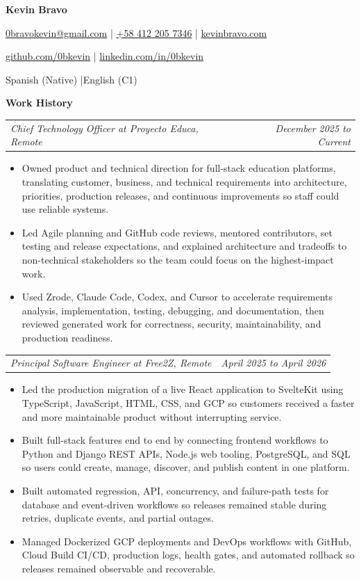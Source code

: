 \documentclass[10pt,letterpaper]{article}
\makeatletter
\newcommand{\bodyfont}{\fontsize{10.5}{15.75}\selectfont}
\newcommand{\contactfont}{\fontsize{12}{15}\selectfont}
\newcommand{\sectiontitle}[1]{%
  \vspace{4pt}
  {\bodyfont\textbf{#1}}\par
  \nopagebreak[4]
  \vspace{2pt}
}
\newcommand{\roleline}[2]{%
  \begin{tabularx}{\textwidth}{@{}Xr@{}}
    \bodyfont\textit{#1} & \bodyfont\textit{#2}
  \end{tabularx}
  \nopagebreak[4]
  \vspace{1pt}
}
\makeatother
\begin{document}
\bodyfont
\raggedright

\begin{center}
  {\fontsize{14}{17}\selectfont\textbf{Kevin Bravo}}\par
  \vspace{3pt}
  {\contactfont
    \href{mailto:0bravokevin@gmail.com}{0bravokevin@gmail.com}
    \enspace|\enspace
    \href{tel:+584122057346}{+58 412 205 7346}
    \enspace|\enspace
    \href{https://kevinbravo.com}{kevinbravo.com}
  }\par
  {\contactfont
    \href{https://github.com/0bkevin}{github.com/0bkevin}
    \enspace|\enspace
    \href{https://www.linkedin.com/in/0bkevin/}{linkedin.com/in/0bkevin}
  }\par
  {\contactfont Spanish (Native) \enspace|\enspace English (C1)}
\end{center}

\sectiontitle{Work History}

\roleline{Chief Technology Officer at Proyecto Educa, Remote}{December 2025 to Current}
\begin{itemize}
  \item Owned product and technical direction for full-stack education platforms, translating customer, business, and technical requirements into architecture, priorities, production releases, and continuous improvements so staff could use reliable systems.
  \item Led Agile planning and GitHub code reviews, mentored contributors, set testing and release expectations, and explained architecture and tradeoffs to non-technical stakeholders so the team could focus on the highest-impact work.
  \item Used Zrode, Claude Code, Codex, and Cursor to accelerate requirements analysis, implementation, testing, debugging, and documentation, then reviewed generated work for correctness, security, maintainability, and production readiness.
\end{itemize}

\vspace{3pt}
\roleline{Principal Software Engineer at Free2Z, Remote}{April 2025 to April 2026}
\begin{itemize}
  \item Led the production migration of a live React application to SvelteKit using TypeScript, JavaScript, HTML, CSS, and GCP so customers received a faster and more maintainable product without interrupting service.
  \item Built full-stack features end to end by connecting frontend workflows to Python and Django REST APIs, Node.js web tooling, PostgreSQL, and SQL so users could create, manage, discover, and publish content in one platform.
  \item Built automated regression, API, concurrency, and failure-path tests for database and event-driven workflows so releases remained stable during retries, duplicate events, and partial outages.
  \item Managed Dockerized GCP deployments and DevOps workflows with GitHub, Cloud Build CI/CD, production logs, health gates, and automated rollback so releases remained observable and recoverable.
\end{itemize}
\end{document}
